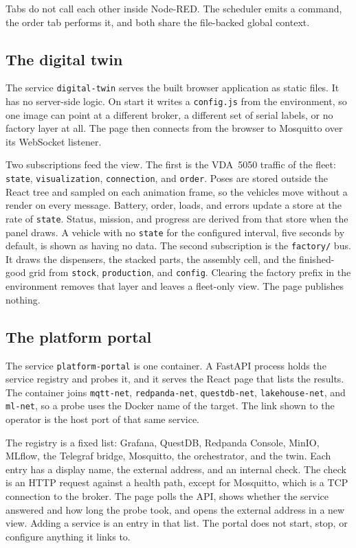 Tabs do not call each other inside Node-RED. The scheduler emits a command, the order tab performs it, and both share the file-backed global context.

\subsection{The digital twin}
\label{subsec:digital-twin-implementation}

The service \texttt{digital-twin} serves the built browser application as static files. It has no server-side logic. On start it writes a \texttt{config.js} from the environment, so one image can point at a different broker, a different set of serial labels, or no factory layer at all. The page then connects from the browser to Mosquitto over its WebSocket listener.

Two subscriptions feed the view. The first is the VDA~5050 traffic of the fleet: \texttt{state}, \texttt{visualization}, \texttt{connection}, and \texttt{order}. Poses are stored outside the React tree and sampled on each animation frame, so the vehicles move without a render on every message. Battery, order, loads, and errors update a store at the rate of \texttt{state}. Status, mission, and progress are derived from that store when the panel draws. A vehicle with no \texttt{state} for the configured interval, five seconds by default, is shown as having no data. The second subscription is the \texttt{factory/} bus. It draws the dispensers, the stacked parts, the assembly cell, and the finished-good grid from \texttt{stock}, \texttt{production}, and \texttt{config}. Clearing the factory prefix in the environment removes that layer and leaves a fleet-only view. The page publishes nothing.

\subsection{The platform portal}
\label{subsec:platform-portal-implementation}

The service \texttt{platform-portal} is one container. A FastAPI process holds the service registry and probes it, and it serves the React page that lists the results. The container joins \texttt{mqtt-net}, \texttt{redpanda-net}, \texttt{questdb-net}, \texttt{lakehouse-net}, and \texttt{ml-net}, so a probe uses the Docker name of the target. The link shown to the operator is the host port of that same service.

The registry is a fixed list: Grafana, QuestDB, Redpanda Console, MinIO, MLflow, the Telegraf bridge, Mosquitto, the orchestrator, and the twin. Each entry has a display name, the external address, and an internal check. The check is an HTTP request against a health path, except for Mosquitto, which is a TCP connection to the broker. The page polls the API, shows whether the service answered and how long the probe took, and opens the external address in a new view. Adding a service is an entry in that list. The portal does not start, stop, or configure anything it links to.

